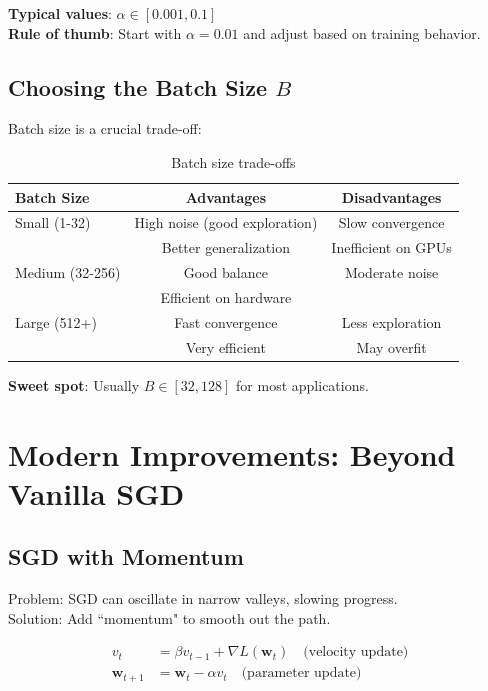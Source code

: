 \documentclass[11pt]{article}
\newcommand{\w}{\mathbf{w}}
\begin{document}
\textbf{Typical values}: $\alpha \in [0.001, 0.1]$\\
\textbf{Rule of thumb}: Start with $\alpha = 0.01$ and adjust based on training behavior.

\subsection{Choosing the Batch Size $B$}
Batch size is a crucial trade-off:

\begin{table}[h!]
\centering
\begin{tabular}{@{}lcc@{}}
\toprule
\textbf{Batch Size} & \textbf{Advantages} & \textbf{Disadvantages} \\
\midrule
Small (1-32) & High noise (good exploration) & Slow convergence \\
 & Better generalization & Inefficient on GPUs \\
\midrule
Medium (32-256) & Good balance & Moderate noise \\
 & Efficient on hardware & \\
\midrule
Large (512+) & Fast convergence & Less exploration \\
 & Very efficient & May overfit \\
\bottomrule
\end{tabular}
\caption{Batch size trade-offs}
\label{tab:batch_size}
\end{table}

\textbf{Sweet spot}: Usually $B \in [32, 128]$ for most applications.

\section{Modern Improvements: Beyond Vanilla SGD}

\subsection{SGD with Momentum}
Problem: SGD can oscillate in narrow valleys, slowing progress.\\
Solution: Add ``momentum" to smooth out the path.

\begin{align}
v_t &= \beta v_{t-1} + \nabla L(\w_t) \quad \text{(velocity update)} \\
\w_{t+1} &= \w_t - \alpha v_t \quad \text{(parameter update)}
\end{align}
\end{document}
